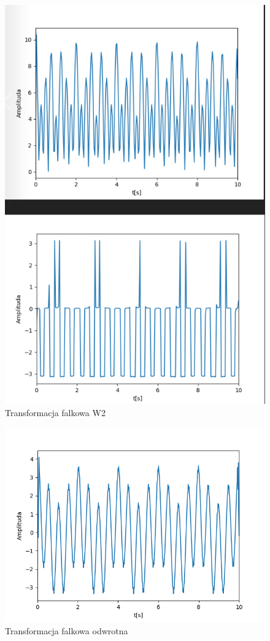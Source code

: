 \documentclass[12pt]{article}
\begin{document}
\begin{figure}[H]
\centering
\includegraphics[scale=0.6]{s1FalkaW2.png}
\caption{Transformacja falkowa W2}
\end{figure}

\begin{figure}[H]
\centering
\includegraphics[scale=0.6]{s1FalkaOdwrocona.png}
\caption{Transformacja falkowa odwrotna}
\end{figure}
\end{document}
